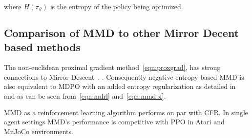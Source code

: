 where $H(\pi_\theta)$ is the entropy of the policy
being optimized.

\subsection{Comparison of MMD to other Mirror Decent based methods}

The non-euclidean proximal gradient method~\ref{eqn:proxgrad}, has strong connections to Mirror Descent~\cite[Appendix D.3]{sokotaUnified2023}.
.
Consequently negative entropy based MMD is also equivalent to MDPO with an added entropy regularization 
as detailed in~\cite[Appendix L]{sokotaUnified2023} and as can be seen from~\ref{eqn:mdrl} and~\ref{eqn:mmdbf}.


MMD as a reinforcement learning algorithm performs on par with CFR.
In single agent settings MMD's performance is competitive with PPO in Atari and MuJoCo
environments.